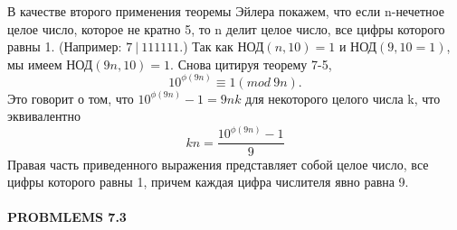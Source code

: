 \documentclass[11pt, leqno]{article}
\begin{document}
\qquad В качестве второго применения теоремы Эйлера покажем, что если n-нечетное целое число, которое не кратно 5, то n делит целое число, все цифры которого равны 1. (Например: $7\ |\ 111111$.) Так как НОД$(n, 10) = 1$ и НОД$(9, 10 = 1)$, мы имеем НОД$(9n, 10) = 1$. Снова цитируя теорему 7-5,
$$10^{\phi(9n)} \equiv 1 (mod\ 9n).$$
Это говорит о том, что $10^{\phi(9n)} - 1 = 9nk$ для некоторого целого числа k, что эквивалентно
$$kn = \frac{10^{\phi(9n)} - 1}{9}$$
Правая часть приведенного выражения представляет собой целое число, все цифры которого равны 1, причем каждая цифра числителя явно равна 9.

\begin{center}
	\item \paragraph{PROBMLEMS 7.3}
\end{center}
\end{document}
